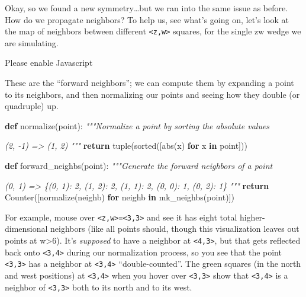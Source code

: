 \documentclass[]{article}
\newenvironment{Shaded}{}{}
\newcommand{\BuiltInTok}[1]{#1}
\newcommand{\CommentTok}[1]{\textcolor[rgb]{0.38,0.63,0.69}{\textit{#1}}}
\newcommand{\ControlFlowTok}[1]{\textcolor[rgb]{0.00,0.44,0.13}{\textbf{#1}}}
\newcommand{\KeywordTok}[1]{\textcolor[rgb]{0.00,0.44,0.13}{\textbf{#1}}}
\newcommand{\NormalTok}[1]{#1}
\begin{document}
Okay, so we found a new symmetry\ldots but we ran into the same issue as before.
How do we propagate neighbors? To help us, see what's going on, let's look at
the map of neighbors between different \texttt{\textless{}z,w\textgreater{}}
squares, for the single zw wedge we are simulating.

\leavevmode\hypertarget{golSyms4DForward}{}%
Please enable Javascript

These are the ``forward neighbors''; we can compute them by expanding a point to
its neighbors, and then normalizing our points and seeing how they double (or
quadruple) up.

\begin{Shaded}
\begin{Highlighting}[]
\KeywordTok{def}\NormalTok{ normalize(point):}
    \CommentTok{"""Normalize a point by sorting the absolute values}

\CommentTok{    (2, {-}1)}
\CommentTok{    => (1, 2)}
\CommentTok{    """}
    \ControlFlowTok{return} \BuiltInTok{tuple}\NormalTok{(}\BuiltInTok{sorted}\NormalTok{([}\BuiltInTok{abs}\NormalTok{(x) }\ControlFlowTok{for}\NormalTok{ x }\KeywordTok{in}\NormalTok{ point]))}

\KeywordTok{def}\NormalTok{ forward\_neighbs(point):}
    \CommentTok{"""Generate the forward neighbors of a point}

\CommentTok{    (0, 1)}
\CommentTok{    => \{(0, 1): 2, (1, 2): 2, (1, 1): 2, (0, 0): 1, (0, 2): 1\}}
\CommentTok{    """}
    \ControlFlowTok{return}\NormalTok{ Counter([normalize(neighb) }\ControlFlowTok{for}\NormalTok{ neighb }\KeywordTok{in}\NormalTok{ mk\_neighbs(point)])}
\end{Highlighting}
\end{Shaded}

For example, mouse over
\texttt{\textless{}z,w\textgreater{}=\textless{}3,3\textgreater{}} and see it
has eight total higher-dimensional neighbors (like all points should, though
this visualization leaves out points at w\textgreater6). It's \emph{supposed} to
have a neighbor at \texttt{\textless{}4,3\textgreater{}}, but that gets
reflected back onto \texttt{\textless{}3,4\textgreater{}} during our
normalization process, so you see that the point
\texttt{\textless{}3,3\textgreater{}} has a neighbor at
\texttt{\textless{}3,4\textgreater{}} ``double-counted''. The green squares (in
the north and west positions) at \texttt{\textless{}3,4\textgreater{}} when you
hover over \texttt{\textless{}3,3\textgreater{}} show that
\texttt{\textless{}3,4\textgreater{}} is a neighbor of
\texttt{\textless{}3,3\textgreater{}} both to its north and to its west.
\end{document}
